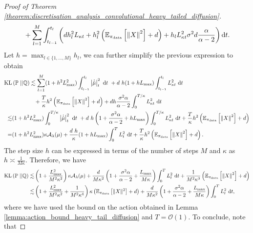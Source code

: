 \begin{proof}[Proof of Theorem \ref{theorem:discretisation_analysis_convolutional_heavy_tailed_diffusion}]
\begin{align*}
   &+ \sum_{l=1}^M\int_{t_{l-1}}^{t_l} \left(d h_l^2 L_{\kappa t} + h_l^2 \left(\mathbb{E}_{\operatorname*{\pi_{\text{data}}}}\left[\left\Vert X\right\Vert^2\right] + d\right) +h_l L_{\kappa t}^2\sigma^2 d \frac{\alpha}{\alpha-2}\right) \mathrm{d} t.\\
\end{align*}
Let $h = \max_{l\in\{1, \dots, M\}} h_l$, we can further simplify the previous expression to obtain
\small
\begin{align*}
    \operatorname*{KL}&\left(\mathbb{P}\;||\mathbb{Q}\right)\lesssim \sum_{l=1}^M (1+h^2 L_{\max}^2)\int_{t_{l-1}}^{t_l} \left\vert\Dot{\hat{\mu}}\right\vert_t^2 \ \mathrm{d} t\ + d\ h(1+ h L_{\max}) \int_{t_{l-1}}^{t_l} L_{\kappa t}^2 \ \mathrm{d} t\\
    &\quad\quad\quad\quad+ \frac{T}{\kappa}h^2\left(\mathbb{E}_{\operatorname*{\pi_{\text{data}}}}\left[\left\Vert X\right\Vert^2\right] + d\right) + dh \frac{\sigma^2\alpha}{\alpha-2} \int_{0}^{T/\kappa} L_{\kappa t}^2 \ \mathrm{d} t\\
     \lesssim& (1+h^2 L_{\max}^2) \int_{0}^{T/\kappa} \left\vert\Dot{\hat{\mu}}\right\vert_t^2 \ \mathrm{d} t\ + 
 d\ h\left(1+ \frac{\sigma^2\alpha}{\alpha-2}+ h L_{\max}\right)\int_{0}^{T/\kappa} L_{\kappa t}^2 \ \mathrm{d} t + \frac{T}{\kappa} h^2\left(\mathbb{E}_{\operatorname*{\pi_{\text{data}}}}\left[\left\Vert X\right\Vert^2\right] + d\right)\\
 =&  (1+h^2 L_{\max}^2) \kappa \mathcal{A}_{\lambda}(\mu)  + 
\frac{d\ h}{\kappa} (1+ h L_{\max})\int_{0}^{T} L_{ t}^2 \ \mathrm{d} t+ \frac{T}{\kappa} h^2\left(\mathbb{E}_{\operatorname*{\pi_{\text{data}}}}\left[\left\Vert X\right\Vert^2\right] + d\right).
\end{align*}
\normalsize
The step size $h$ can be expressed in terms of the number of steps $M$ and $\kappa$ as $h\asymp \frac{1}{M\kappa}$. Therefore, we have
\small
\begin{align*}
    \operatorname*{KL}\left(\mathbb{P}\;||\mathbb{Q}\right)\lesssim&\left(1+\frac{L_{\max}^2}{M^2\kappa^2}\right) \kappa \mathcal{A}_\lambda(\mu) + \frac{d}{M\kappa^2}\left(1+\frac{\sigma^2\alpha}{\alpha -2} +   \frac{L_{\max}}{M\kappa}\right)\int_{0}^{T} L_{ t}^2 \ \mathrm{d} t+ \frac{1}{M^2\kappa^3}\left(\mathbb{E}_{\operatorname*{\pi_{\text{data}}}}\left[\left\Vert X\right\Vert^2\right] + d\right)\\
    \lesssim& \left(1+\frac{L_{\max}^2}{M^2\kappa^2}+\frac{1}{M^2\kappa^4}\right) \kappa \left(\mathbb{E}_{\operatorname*{\pi_{\text{data}}}}\left[\Vert X\Vert^2\right] + d\right) + \frac{d}{M\kappa^2}\left(1 + \frac{\sigma^2\alpha}{\alpha -2}+  \frac{L_{\max}}{M\kappa}\right)\int_{0}^{T} L_{ t}^2 \ \mathrm{d} t,
\end{align*}
\normalsize
where we have used the bound on the action obtained in Lemma \ref{lemma:action_bound_heavy_tail_diffusion} and $T = \mathcal{O}(1)$. To conclude, note that 

\end{proof}
